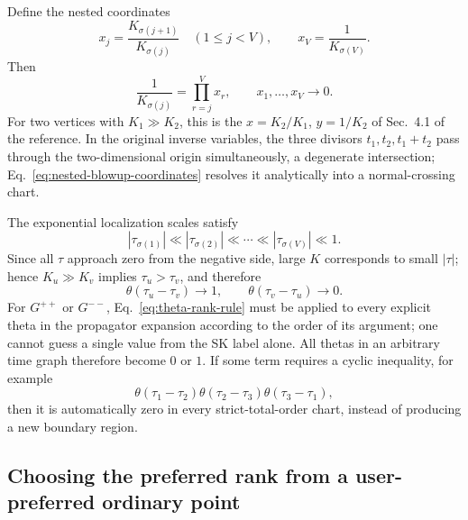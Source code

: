 \documentclass[11pt,a4paper]{article}
\begin{document}
Define the nested coordinates
\begin{equation}
 x_j=\frac{K_{\sigma(j+1)}}{K_{\sigma(j)}}
 \quad(1\leq j<V),
 \qquad
 x_V=\frac{1}{K_{\sigma(V)}}.
 \label{eq:nested-blowup-coordinates}
\end{equation}
Then
\begin{equation}
 \frac{1}{K_{\sigma(j)}}=\prod_{r=j}^{V}x_r,
 \qquad x_1,\ldots,x_V\longrightarrow0.
 \label{eq:nested-energy-inverse}
\end{equation}
For two vertices with $K_1\gg K_2$, this is the $x=K_2/K_1$, $y=1/K_2$ of Sec.~4.1 of the reference. In the original inverse variables, the three divisors $t_1,t_2,t_1+t_2$ pass through the two-dimensional origin simultaneously, a degenerate intersection; Eq.~\eqref{eq:nested-blowup-coordinates} resolves it analytically into a normal-crossing chart.

The exponential localization scales satisfy
\begin{equation}
 |\tau_{\sigma(1)}|\ll|\tau_{\sigma(2)}|\ll\cdots
 \ll|\tau_{\sigma(V)}|\ll1.
 \label{eq:tau-rank}
\end{equation}
Since all $\tau$ approach zero from the negative side, large $K$ corresponds to small $|\tau|$; hence $K_u\gg K_v$ implies $\tau_u>\tau_v$, and therefore
\begin{equation}
 \theta(\tau_u-\tau_v)\longrightarrow1,
 \qquad
 \theta(\tau_v-\tau_u)\longrightarrow0.
 \label{eq:theta-rank-rule}
\end{equation}
For $G^{++}$ or $G^{--}$, Eq.~\eqref{eq:theta-rank-rule} must be applied to every explicit theta in the propagator expansion according to the order of its argument; one cannot guess a single value from the SK label alone. All thetas in an arbitrary time graph therefore become $0$ or $1$. If some term requires a cyclic inequality, for example
\begin{equation}
 \theta(\tau_1-\tau_2)\theta(\tau_2-\tau_3)
 \theta(\tau_3-\tau_1),
\end{equation}
then it is automatically zero in every strict-total-order chart, instead of producing a new boundary region.

\subsection{Choosing the preferred rank from a user-preferred ordinary point}
\end{document}
